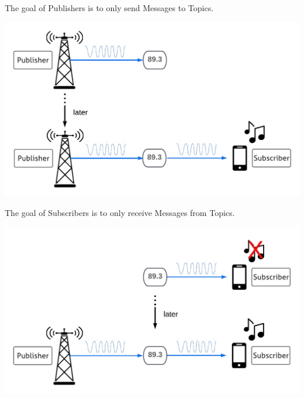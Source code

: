 \documentclass[usenames,11,dvipsnames,svgnames,x11names,aspectratio=1610,bibref]{beamer}
\renewcommand\sec{{\cnordSix{\secname}\hfill\mydisclaimer} }
\begin{document}
\begin{frame}[fragile]{\sec}
\vspace*{\fill}
\begin{center} 
The goal of Publishers is to only send Messages to Topics.

\includegraphics[width=.7\linewidth]{figures/lecture2/analogy4.pdf}

\end{center}
\vspace*{\fill}
\end{frame}


\begin{frame}[fragile]{\sec}
\vspace*{\fill}
\begin{center} 
The goal of Subscribers is to only receive Messages from Topics.

\includegraphics[width=.7\linewidth]{figures/lecture2/analogy5.pdf}

\end{center}
\vspace*{\fill}
\end{frame}
\end{document}
